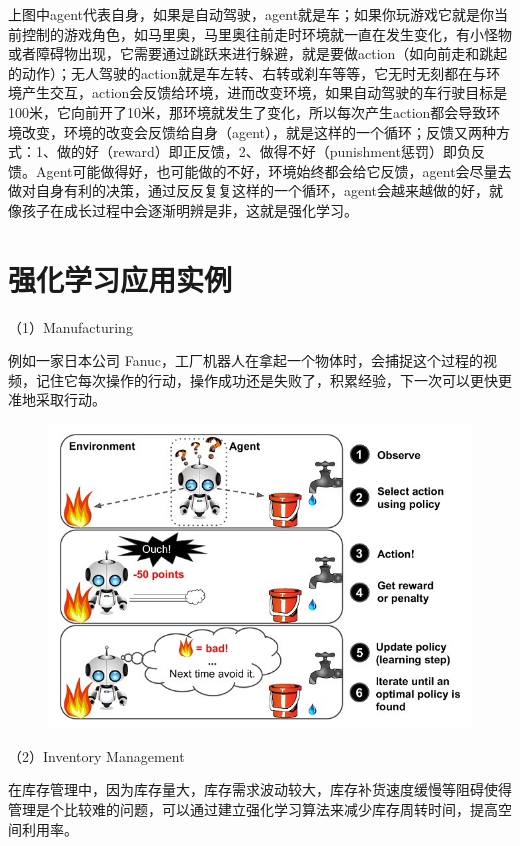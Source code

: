 上图中agent代表自身，如果是自动驾驶，agent就是车；如果你玩游戏它就是你当前控制的游戏角色，如马里奥，马里奥往前走时环境就一直在发生变化，有小怪物或者障碍物出现，它需要通过跳跃来进行躲避，就是要做action（如向前走和跳起的动作）；无人驾驶的action就是车左转、右转或刹车等等，它无时无刻都在与环境产生交互，action会反馈给环境，进而改变环境，如果自动驾驶的车行驶目标是100米，它向前开了10米，那环境就发生了变化，所以每次产生action都会导致环境改变，环境的改变会反馈给自身（agent），就是这样的一个循环；反馈又两种方式：1、做的好（reward）即正反馈，2、做得不好（punishment惩罚）即负反馈。Agent可能做得好，也可能做的不好，环境始终都会给它反馈，agent会尽量去做对自身有利的决策，通过反反复复这样的一个循环，agent会越来越做的好，就像孩子在成长过程中会逐渐明辨是非，这就是强化学习。

\section{强化学习应用实例}\label{ux5f3aux5316ux5b66ux4e60ux5e94ux7528ux5b9eux4f8b}

（1）Manufacturing

例如一家日本公司
Fanuc，工厂机器人在拿起一个物体时，会捕捉这个过程的视频，记住它每次操作的行动，操作成功还是失败了，积累经验，下一次可以更快更准地采取行动。

\begin{figure}
\centering
\includegraphics{./img/ch10/10-2.png}
\caption{}
\end{figure}

（2）Inventory Management

在库存管理中，因为库存量大，库存需求波动较大，库存补货速度缓慢等阻碍使得管理是个比较难的问题，可以通过建立强化学习算法来减少库存周转时间，提高空间利用率。

